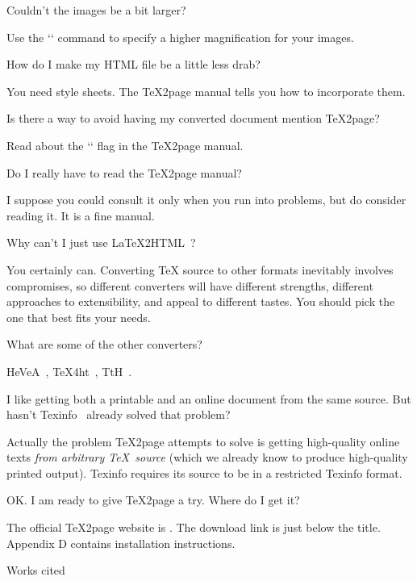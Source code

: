 {\question Couldn’t the images be a bit larger?}

Use the `\imgpreamble` command to specify a higher
magnification for your images.

{\question How do I make my HTML file be a little
less drab?}

You need style sheets.  The \TeX2page manual tells you
how to incorporate them.

{\question Is there a way to avoid having my converted
document mention \TeX2page?}

Read about the `\TZPcolophoncredit` flag in the
\TeX2page manual.

{\question Do I really have to read the \TeX2page
manual?}

I suppose you could consult it only when you run into
problems, but do consider reading it.  It is a fine
manual.

{\question Why can’t I just use \LaTeX2HTML~\cite{latex2html}?}

You certainly can.  Converting TeX source to other
formats inevitably involves compromises, so different
converters will have different strengths, different
approaches to extensibility, and
appeal to different tastes.  You should pick the one
that best fits your needs.

{\question What are some of the other converters?}

HeVeA~\cite{hevea}, \TeX4ht~\cite{tex4ht}, TtH~\cite{tth}.

{\question I like getting both a
printable and an online document from the same source.
But hasn’t Texinfo~\cite{texinfo} already solved that problem?}

Actually the problem \TeX2page attempts to solve is getting
high-quality online texts {\em from
arbitrary \TeX\
source} (which we  already know to produce high-quality
printed output).  Texinfo requires its source to be in a
restricted Texinfo format.

{\question OK.  I am ready to give \TeX2page a try.
Where do I get it?}

The official \TeX2page website is
.
The download link is just below the title.  Appendix D
contains installation instructions.

\beginsection Works cited




\bye
